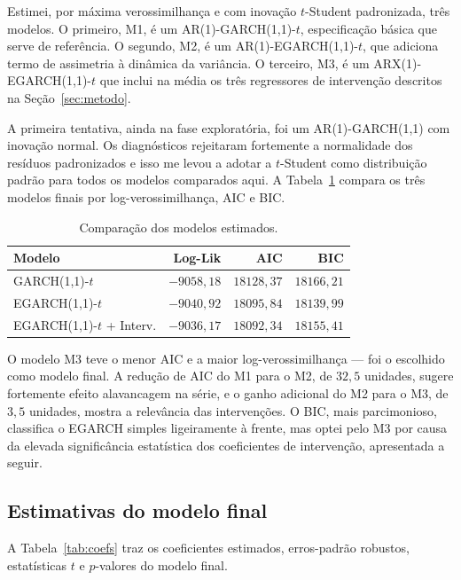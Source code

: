 \documentclass[12pt, a4paper]{article}
\begin{document}
Estimei, por máxima verossimilhança e com inovação $t$-Student padronizada, três modelos. O primeiro, M1, é um AR(1)-GARCH(1,1)-$t$, especificação básica que serve de referência. O segundo, M2, é um AR(1)-EGARCH(1,1)-$t$, que adiciona termo de assimetria à dinâmica da variância. O terceiro, M3, é um ARX(1)-EGARCH(1,1)-$t$ que inclui na média os três regressores de intervenção descritos na Seção~\ref{sec:metodo}.

A primeira tentativa, ainda na fase exploratória, foi um AR(1)-GARCH(1,1) com inovação normal. Os diagnósticos rejeitaram fortemente a normalidade dos resíduos padronizados e isso me levou a adotar a $t$-Student como distribuição padrão para todos os modelos comparados aqui. A Tabela~\ref{tab:comparacao} compara os três modelos finais por log-verossimilhança, AIC e BIC.

\begin{table}[H]
\centering
\caption{Comparação dos modelos estimados.}
\label{tab:comparacao}
\begin{tabular}{lrrr}
\toprule
Modelo & Log-Lik & AIC & BIC \\
\midrule
GARCH(1,1)-$t$              & $-9058{,}18$ & $18128{,}37$ & $18166{,}21$ \\
EGARCH(1,1)-$t$             & $-9040{,}92$ & $18095{,}84$ & $18139{,}99$ \\
EGARCH(1,1)-$t$ + Interv.   & $-9036{,}17$ & $18092{,}34$ & $18155{,}41$ \\
\bottomrule
\end{tabular}
\end{table}

O modelo M3 teve o menor AIC e a maior log-verossimilhança --- foi o escolhido como modelo final. A redução de AIC do M1 para o M2, de $32{,}5$ unidades, sugere fortemente efeito alavancagem na série, e o ganho adicional do M2 para o M3, de $3{,}5$ unidades, mostra a relevância das intervenções. O BIC, mais parcimonioso, classifica o EGARCH simples ligeiramente à frente, mas optei pelo M3 por causa da elevada significância estatística dos coeficientes de intervenção, apresentada a seguir.

\subsection{Estimativas do modelo final}

A Tabela~\ref{tab:coefs} traz os coeficientes estimados, erros-padrão robustos, estatísticas $t$ e $p$-valores do modelo final.
\end{document}
